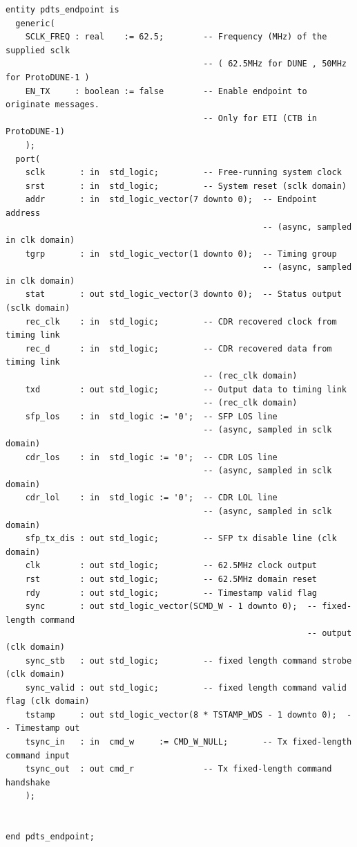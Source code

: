 \documentclass[a4paper,11pt]{article}
\begin{document}
\begin{verbatim}
entity pdts_endpoint is
  generic(
    SCLK_FREQ : real    := 62.5;        -- Frequency (MHz) of the supplied sclk
                                        -- ( 62.5MHz for DUNE , 50MHz for ProtoDUNE-1 )
    EN_TX     : boolean := false        -- Enable endpoint to originate messages.
                                        -- Only for ETI (CTB in ProtoDUNE-1)
    );
  port(
    sclk       : in  std_logic;         -- Free-running system clock
    srst       : in  std_logic;         -- System reset (sclk domain)
    addr       : in  std_logic_vector(7 downto 0);  -- Endpoint address
                                                    -- (async, sampled in clk domain)
    tgrp       : in  std_logic_vector(1 downto 0);  -- Timing group
                                                    -- (async, sampled in clk domain)
    stat       : out std_logic_vector(3 downto 0);  -- Status output (sclk domain)
    rec_clk    : in  std_logic;         -- CDR recovered clock from timing link
    rec_d      : in  std_logic;         -- CDR recovered data from timing link
                                        -- (rec_clk domain)
    txd        : out std_logic;         -- Output data to timing link
                                        -- (rec_clk domain)
    sfp_los    : in  std_logic := '0';  -- SFP LOS line
                                        -- (async, sampled in sclk domain)
    cdr_los    : in  std_logic := '0';  -- CDR LOS line
                                        -- (async, sampled in sclk domain)
    cdr_lol    : in  std_logic := '0';  -- CDR LOL line
                                        -- (async, sampled in sclk domain)
    sfp_tx_dis : out std_logic;         -- SFP tx disable line (clk domain)
    clk        : out std_logic;         -- 62.5MHz clock output
    rst        : out std_logic;         -- 62.5MHz domain reset
    rdy        : out std_logic;         -- Timestamp valid flag
    sync       : out std_logic_vector(SCMD_W - 1 downto 0);  -- fixed-length command
                                                             -- output (clk domain)
    sync_stb   : out std_logic;         -- fixed length command strobe (clk domain)
    sync_valid : out std_logic;         -- fixed length command valid flag (clk domain)
    tstamp     : out std_logic_vector(8 * TSTAMP_WDS - 1 downto 0);  -- Timestamp out
    tsync_in   : in  cmd_w     := CMD_W_NULL;       -- Tx fixed-length command input
    tsync_out  : out cmd_r              -- Tx fixed-length command handshake
    );


end pdts_endpoint;
\end{verbatim}
\end{document}

